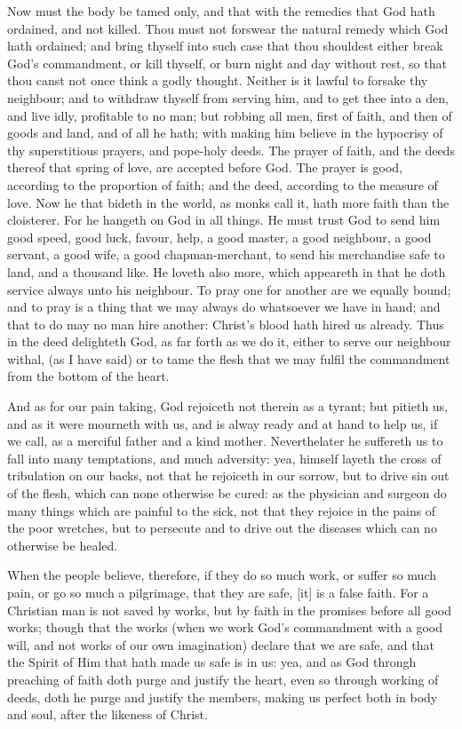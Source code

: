Now must the body be tamed only, and that with the 
remedies that God hath ordained, and not killed. Thou 
must not forswear the natural remedy which God hath ordained;
and bring thyself into such case that thou shouldest 
either break God's commandment, or kill thyself, or 
burn night and day without rest, so that thou canst not 
once think a godly thought. Neither is it lawful to forsake 
thy neighbour; and to withdraw thyself from serving him, 
and to get thee into a den, and live idly, profitable to no 
man; but robbing all men, first of faith, and then of goods 
and land, and of all he hath; with making him believe in 
the hypocrisy of thy superstitious prayers, and pope-holy 
deeds. The prayer of faith, and the deeds thereof that
spring of love, are accepted before God. The prayer is
good, according to the proportion of faith; and the deed,
according to the measure of love. Now he that bideth
in the world, as monks call it, hath more faith than the
cloisterer. For he hangeth on God in all things. He
must trust God to send him good speed, good luck,
favour, help, a good master, a good neighbour, a good 
servant, a good wife, a good chapman-merchant, to send 
his merchandise safe to land, and a thousand like. He 
loveth also more, which appeareth in that he doth service always
unto his neighbour. To pray one for another are we 
equally bound; and to pray is a thing that we may always 
do whatsoever we have in hand; and that to do may no man 
hire another: Christ's blood hath hired us already. Thus 
in the deed delighteth God, as far forth as we do it, either 
to serve our neighbour withal, (as I have said) or to tame 
the flesh that we may fulfil the commandment from the 
bottom of the heart. 

And as for our pain taking, God rejoiceth not therein 
as a tyrant; but pitieth us, and as it were mourneth with 
us, and is alway ready and at hand to help us, if we call, 
as a merciful father and a kind mother. Neverthelater 
he suffereth us to fall into many temptations, and much 
adversity: yea, himself layeth the cross of tribulation on 
our backs, not that he rejoiceth in our sorrow, but to 
drive sin out of the flesh, which can none otherwise be 
cured: as the physician and surgeon do many things which 
are painful to the sick, not that they rejoice in the pains 
of the poor wretches, but to persecute and to drive out 
the diseases which can no otherwise be healed. 

When the people believe, therefore, if they do so 
much work, or suffer so much pain, or go so much a 
pilgrimage, that they are safe, [it] is a false faith. For a 
Christian man is not saved by works, but by faith in the 
promises before all good works; though that the works 
(when we work God's commandment with a good will, 
and not works of our own imagination) declare that we 
are safe, and that the Spirit of Him that hath made us 
safe is in us: yea, and as God throngh preaching of faith 
doth purge and justify the heart, even so through working 
of deeds, doth he purge and justify the members, making 
us perfect both in body and soul, after the likeness of 
Christ. 

